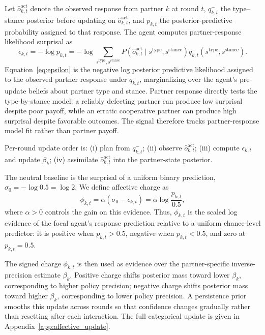 \documentclass[runningheads,orivec]{llncs}
\begin{document}
Let \(\hat{o}_{k,t}^{\text{act}}\) denote the observed response from partner \(k\) at round \(t\), \(q_{k,t}^-\) the type--stance posterior before updating on \(\hat{o}_{k,t}^{\text{act}}\), and \(p_{k,t}\) the posterior-predictive probability assigned to that response. The agent computes partner-response likelihood surprisal as
\begin{equation}
\epsilon_{k,t} = -\log p_{k,t} = -\log \sum_{s^{\text{type}},s^{\text{stance}}}
P\!\left(\hat{o}_{k,t}^{\text{act}} \mid s^{\text{type}},s^{\text{stance}}\right)
q_{k,t}^-(s^{\text{type}},s^{\text{stance}}).
\label{eq:epsilon}
\end{equation}
Equation~\eqref{eq:epsilon} is the negative log posterior predictive likelihood assigned to the observed partner response under \(q_{k,t}^-\), marginalizing over the agent's pre-update beliefs about partner type and stance. Partner response directly tests the type-by-stance model: a reliably defecting partner can produce low surprisal despite poor payoff, while an erratic cooperative partner can produce high surprisal despite favorable outcomes. The signal therefore tracks partner-response model fit rather than partner payoff.

Per-round update order is: (i) plan from \(q_{k,t}^-\); (ii) observe \(\hat{o}_{k,t}^{\text{act}}\); (iii) compute \(\epsilon_{k,t}\) and update \(\beta_k\); (iv) assimilate \(\hat{o}_{k,t}^{\text{act}}\) into the partner-state posterior.

The neutral baseline is the surprisal of a uniform binary prediction, \(\sigma_0=-\log 0.5=\log 2\). We define affective charge as
\begin{equation}
\phi_{k,t}
= \alpha\!\left(\sigma_0 - \epsilon_{k,t}\right)
= \alpha \log\frac{p_{k,t}}{0.5},
\label{eq:charge}
\end{equation}
where \(\alpha>0\) controls the gain on this evidence. Thus, \(\phi_{k,t}\) is the scaled log evidence of the focal agent's response prediction relative to a uniform chance-level predictor: it is positive when \(p_{k,t}>0.5\), negative when \(p_{k,t}<0.5\), and zero at \(p_{k,t}=0.5\).

The signed charge $\phi_{k,t}$ is then used as evidence over the partner-specific inverse-precision estimate $\beta_k$. Positive charge shifts posterior mass toward lower $\beta_k$, corresponding to higher policy precision; negative charge shifts posterior mass toward higher $\beta_k$, corresponding to lower policy precision. A persistence prior smooths this update across rounds so that confidence changes gradually rather than resetting after each interaction. The full categorical update is given in Appendix~\ref{app:affective_update}.
\end{document}
